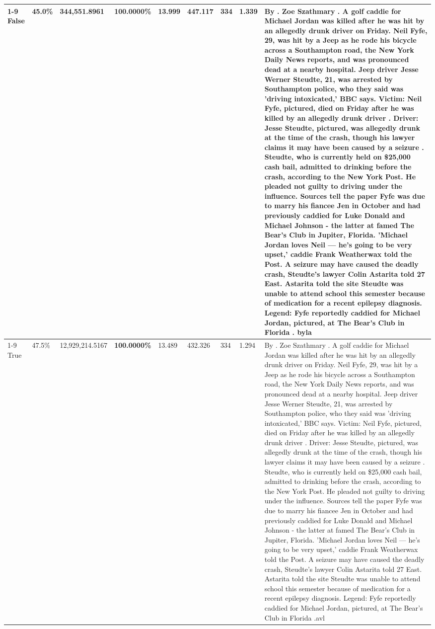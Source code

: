 \begin{table}[H]
\begin{tabular}{lllrlllll}
\cline{1-9}
False & 45.0\% & 344,551.8961 & \bfseries \color{red} 100.0000\% & 13.999 & 447.117 & 334 & 1.339 & By . Zoe Szathmary . A golf caddie for Michael Jordan was killed after he was hit by an allegedly drunk driver on Friday. Neil Fyfe, 29, was hit by a Jeep as he rode his bicycle across a Southampton road, the New York Daily News reports, and was pronounced dead at a nearby hospital. Jeep driver Jesse Werner Steudte, 21, was arrested by Southampton police, who they said was 'driving intoxicated,' BBC says. Victim: Neil Fyfe, pictured, died on Friday after he was killed by an allegedly drunk driver . Driver: Jesse Steudte, pictured, was allegedly drunk at the time of the crash, though his lawyer claims it may have been caused by a seizure . Steudte, who is currently held on \$25,000 cash bail, admitted to drinking before the crash, according to the New York Post. He pleaded not guilty to driving under the influence. Sources tell the paper Fyfe was due to marry his fiancee Jen in October and had previously caddied for Luke Donald and Michael Johnson - the latter at famed The Bear's Club in Jupiter, Florida. 'Michael Jordan loves Neil — he’s going to be very upset,' caddie Frank Weatherwax told the Post. A seizure may have caused the deadly crash, Steudte's lawyer Colin Astarita told 27 East. Astarita told the site Steudte was unable to attend school this semester because of medication for a recent epilepsy diagnosis. Legend: Fyfe reportedly caddied for Michael Jordan, pictured, at The Bear's Club in Florida . byla \\
\cline{1-9}
True & 47.5\% & 12,929,214.5167 & \bfseries \color{red} 100.0000\% & 13.489 & 432.326 & 334 & 1.294 & By . Zoe Szathmary . A golf caddie for Michael Jordan was killed after he was hit by an allegedly drunk driver on Friday. Neil Fyfe, 29, was hit by a Jeep as he rode his bicycle across a Southampton road, the New York Daily News reports, and was pronounced dead at a nearby hospital. Jeep driver Jesse Werner Steudte, 21, was arrested by Southampton police, who they said was 'driving intoxicated,' BBC says. Victim: Neil Fyfe, pictured, died on Friday after he was killed by an allegedly drunk driver . Driver: Jesse Steudte, pictured, was allegedly drunk at the time of the crash, though his lawyer claims it may have been caused by a seizure . Steudte, who is currently held on \$25,000 cash bail, admitted to drinking before the crash, according to the New York Post. He pleaded not guilty to driving under the influence. Sources tell the paper Fyfe was due to marry his fiancee Jen in October and had previously caddied for Luke Donald and Michael Johnson - the latter at famed The Bear's Club in Jupiter, Florida. 'Michael Jordan loves Neil — he’s going to be very upset,' caddie Frank Weatherwax told the Post. A seizure may have caused the deadly crash, Steudte's lawyer Colin Astarita told 27 East. Astarita told the site Steudte was unable to attend school this semester because of medication for a recent epilepsy diagnosis. Legend: Fyfe reportedly caddied for Michael Jordan, pictured, at The Bear's Club in Florida .avl \\

\end{tabular}
\end{table}
